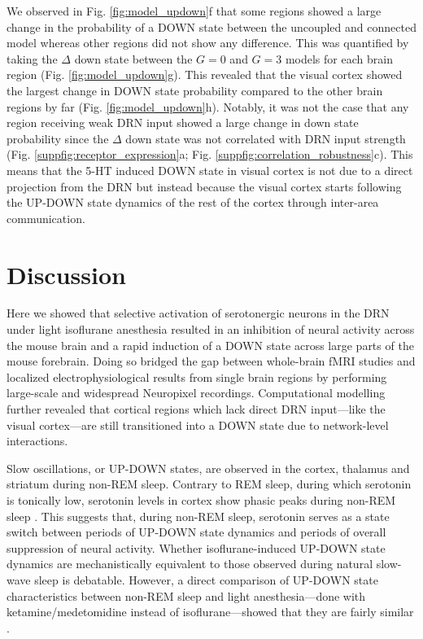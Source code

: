 \documentclass[11pt,a4paper,onecolumn]{article}
\begin{document}
We observed in Fig. \ref{fig:model_updown}f that some regions showed a large change in the probability of a DOWN state between the uncoupled and connected model whereas other regions did not show any difference. This was quantified by taking the $\Delta$ down state between the $G=0$ and $G=3$ models for each brain region (Fig. \ref{fig:model_updown}g). This revealed that the visual cortex showed the largest change in DOWN state probability compared to the other brain regions by far (Fig. \ref{fig:model_updown}h). Notably, it was not the case that any region receiving weak DRN input showed a large change in down state probability since the $\Delta$ down state was not correlated with DRN input strength (Fig. \ref{suppfig:receptor_expression}a; Fig. \ref{suppfig:correlation_robustness}c). This means that the 5-HT induced DOWN state in visual cortex is not due to a direct projection from the DRN but instead because the visual cortex starts following the UP-DOWN state dynamics of the rest of the cortex through inter-area communication. 


\section*{Discussion}
\vspace{-8pt}
\noindent
Here we showed that selective activation of serotonergic neurons in the DRN under light isoflurane anesthesia resulted in an inhibition of neural activity across the mouse brain and a rapid induction of a DOWN state across large parts of the mouse forebrain. Doing so bridged the gap between whole-brain fMRI studies and localized electrophysiological results from single brain regions by performing large-scale and widespread Neuropixel recordings. Computational modelling further revealed that cortical regions which lack direct DRN input—like the visual cortex—are still transitioned into a DOWN state due to network-level interactions. 

Slow oscillations, or UP-DOWN states, are observed in the cortex, thalamus and striatum during non-REM sleep. Contrary to REM sleep, during which serotonin is tonically low, serotonin levels in cortex show phasic peaks during non-REM sleep \citep{deng_improved_2024}. This suggests that, during non-REM sleep, serotonin serves as a state switch between periods of UP-DOWN state dynamics and periods of overall suppression of neural activity. Whether isoflurane-induced UP-DOWN state dynamics are mechanistically equivalent to those observed during natural slow-wave sleep is debatable. However, a direct comparison of UP-DOWN state characteristics between non-REM sleep and light anesthesia—done with ketamine/medetomidine instead of isoflurane—showed that they are fairly similar \citep{torao-angosto_up_2021}. 
\end{document}
